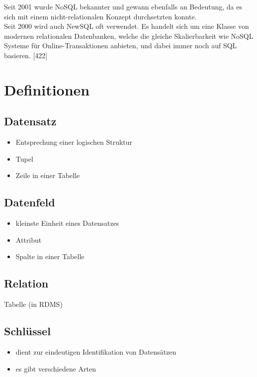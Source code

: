 \documentclass[12pt,a4paper]{report}
\begin{document}
\begin{onehalfspace}
Seit 2001 wurde  NoSQL bekannter und gewann ebenfalls an Bedeutung, da es sich mit einem nicht-relationalen Konzept durchsetzten konnte. \\

Seit 2000 wird auch NewSQL oft verwendet. Es handelt sich um eine Klasse von modernen relationalen Datenbanken, welche die gleiche Skalierbarkeit wie NoSQL Systeme für Online-Transaktionen anbieten, und dabei immer noch auf SQL basieren. [422]

\section{Definitionen}
\subsection{Datensatz}
\begin{itemize}
\item Entsprechung einer logischen Struktur
\item Tupel
\item Zeile in einer Tabelle
\end{itemize}
\subsection{Datenfeld}
\begin{itemize}
\item kleinste Einheit eines Datensatzes
\item Attribut
\item Spalte in einer Tabelle
\end{itemize}
\subsection{Relation}
Tabelle (in RDMS)
\subsection{Schlüssel}
\begin{itemize}
\item dient zur eindeutigen Identifikation von Datensätzen
\item es gibt verschiedene Arten
\end{itemize}

\end{onehalfspace}
\end{document}
